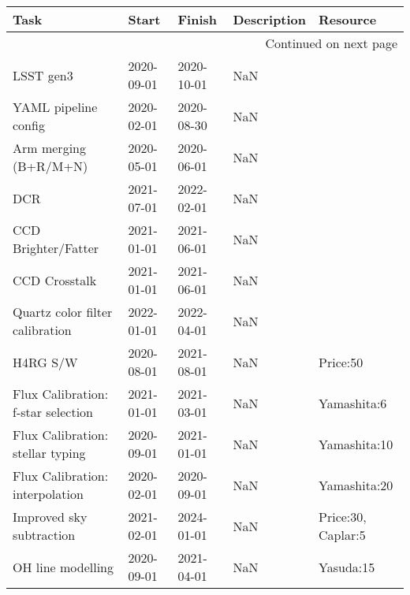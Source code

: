 \begin{longtable}{lllp{2cm}l}
\toprule
                                        Task &       Start &      Finish &              Description &                Resource \\
\midrule
\endhead
\midrule
\multicolumn{5}{r}{{Continued on next page}} \\
\midrule
\endfoot

\bottomrule
\endlastfoot
                                   LSST gen3 &  2020-09-01 &  2020-10-01 &                      NaN &                         \\
                        YAML pipeline config &  2020-02-01 &  2020-08-30 &                      NaN &                         \\
                       Arm merging (B+R/M+N) &  2020-05-01 &  2020-06-01 &                      NaN &                         \\
                                         DCR &  2021-07-01 &  2022-02-01 &                      NaN &                         \\
                         CCD Brighter/Fatter &  2021-01-01 &  2021-06-01 &                      NaN &                         \\
                               CCD Crosstalk &  2021-01-01 &  2021-06-01 &                      NaN &                         \\
             Quartz color filter calibration &  2022-01-01 &  2022-04-01 &                      NaN &                         \\
                                    H4RG S/W &  2020-08-01 &  2021-08-01 &                      NaN &                Price:50 \\
          Flux Calibration: f-star selection &  2021-01-01 &  2021-03-01 &                      NaN &             Yamashita:6 \\
            Flux Calibration: stellar typing &  2020-09-01 &  2021-01-01 &                      NaN &            Yamashita:10 \\
             Flux Calibration: interpolation &  2020-02-01 &  2020-09-01 &                      NaN &            Yamashita:20 \\
                    Improved sky subtraction &  2021-02-01 &  2024-01-01 &                      NaN &      Price:30, Caplar:5 \\
                           OH line modelling &  2020-09-01 &  2021-04-01 &                      NaN &               Yasuda:15 \\

\end{longtable}
